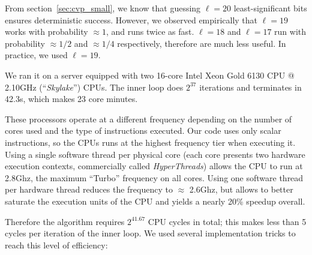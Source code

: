 \documentclass[submission,svgnames,journal=tosc]{iacrtrans}
\begin{document}
From section~\ref{sec:cvp_small}, we know that guessing $\ell=20$
least-significant bits ensures deterministic success. However, we observed
empirically that $\ell=19$ works with probability $\approx 1$, and runs twice as
fast. $\ell=18$ and $\ell=17$ run with probability $\approx 1/2$ and
$\approx 1/4$ respectively, therefore are much less useful. In practice, we used
$\ell=19$.

We ran it on a server equipped with two 16-core \textsf{Intel Xeon Gold 6130 CPU
  @ 2.10GHz} (``\emph{Skylake}'') CPUs. The inner loop does $2^{37}$ iterations
and terminates in 42.3s, which makes 23 core minutes.

These processors operate at a different frequency depending on the number of
cores used and the type of instructions executed. Our code uses only scalar
instructions, so the CPUs runs at the highest frequency tier when executing
it. Using a single software thread per physical core (each core presents two
hardware execution contexts, commercially called \emph{HyperThreads}) allows the
CPU to run at 2.8Ghz, the maximum ``Turbo'' frequency on all cores. Using one
software thread per hardware thread reduces the frequency to $\approx$ 2.6Ghz,
but allows to better saturate the execution units of the CPU and yields a nearly
20\% speedup overall.

Therefore the algorithm requires $2^{41.67}$ CPU cycles in total; this makes
less than 5 cycles per iteration of the inner loop. We used several
implementation tricks to reach this level of efficiency:
\end{document}
